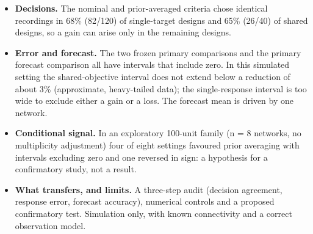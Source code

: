 \begin{itemize}
\tightlist
\item
  \textbf{Decisions.} The nominal and prior-averaged criteria chose identical recordings in 68\% (82/120) of single-target designs and 65\% (26/40) of shared designs, so a gain can arise only in the remaining designs.
\item
  \textbf{Error and forecast.} The two frozen primary comparisons and the primary forecast comparison all have intervals that include zero. In this simulated setting the shared-objective interval does not extend below a reduction of about 3\% (approximate, heavy-tailed data); the single-response interval is too wide to exclude either a gain or a loss. The forecast mean is driven by one network.
\item
  \textbf{Conditional signal.} In an exploratory 100-unit family (n = 8 networks, no multiplicity adjustment) four of eight settings favoured prior averaging with intervals excluding zero and one reversed in sign: a hypothesis for a confirmatory study, not a result.
\item
  \textbf{What transfers, and limits.} A three-step audit (decision agreement, response error, forecast accuracy), numerical controls and a proposed confirmatory test. Simulation only, with known connectivity and a correct observation model.
\end{itemize}
